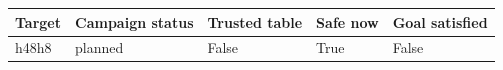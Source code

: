 {\small
\begin{tabular}{lllll}
\hline
Target & Campaign status & Trusted table & Safe now & Goal satisfied \\
\hline
h48h8 & planned & False & True & False \\
\hline
\end{tabular}
}
